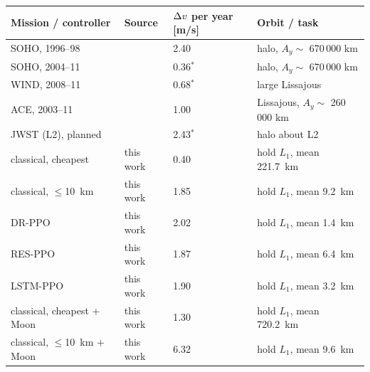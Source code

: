 \begin{tabular}{llll}
\toprule
Mission / controller & Source & $\Delta v$ per year [m/s] & Orbit / task \\
\midrule
SOHO, 1996--98 & \cite{roberts2003} & 2.40 & halo, $A_y \sim$ 670\,000 km \\
SOHO, 2004--11 & \cite{roberts2011} & 0.36$^{*}$ & halo, $A_y \sim$ 670\,000 km \\
WIND, 2008--11 & \cite{roberts2011} & 0.68$^{*}$ & large Lissajous \\
ACE, 2003--11 & \cite{roberts2011} & 1.00 & Lissajous, $A_y \sim$ 260\,000 km \\
JWST (L2), planned & \cite{dichmann2014} & 2.43$^{*}$ & halo about L2 \\
\addlinespace
classical, cheapest & this work & 0.40 & hold $L_1$, mean 221.7~km \\
classical, $\le$10~km & this work & 1.85 & hold $L_1$, mean 9.2~km \\
DR-PPO & this work & 2.02 & hold $L_1$, mean 1.4~km \\
RES-PPO & this work & 1.87 & hold $L_1$, mean 6.4~km \\
LSTM-PPO & this work & 1.90 & hold $L_1$, mean 3.2~km \\
classical, cheapest + Moon & this work & 1.30 & hold $L_1$, mean 720.2~km \\
classical, $\le$10~km + Moon & this work & 6.32 & hold $L_1$, mean 9.6~km \\
\bottomrule
\end{tabular}
